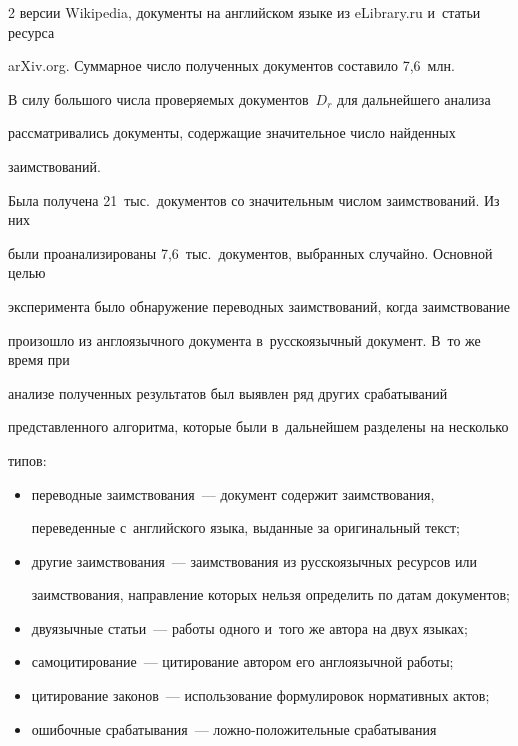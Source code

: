 \begin{multicols}{2}
версии Wikipedia, документы на английском языке из {\sf eLibrary.ru} и~\mbox{статьи} ресурса 


arXiv.org. Суммарное число полученных документов составило 7,6~млн.





В силу большого числа проверяемых документов~$D_r$ для дальнейшего анализа 


рассматривались документы, содержащие значительное число найден\-ных 


заимствований.


Была получена 21~тыс.\ документов со значительным числом заимствований. Из них 


были проанализированы 7,6~тыс.\ документов, выбранных случайно. Основной \mbox{целью} 


эксперимента было обнаружение переводных заимствований, когда заимствование 


произошло из англоязычного документа в~русскоязычный документ. В~то же время при 


анализе полученных результатов был выявлен ряд других срабатываний 


представленного алгоритма, которые были в~дальнейшем разделены на несколько 


типов:


\begin{itemize}


\item переводные заимствования~--- документ содержит заимствования, 


переведенные с~английского языка, выданные за оригинальный текст;


\item другие заимствования~--- заимствования из русскоязычных ресурсов или 


заимствования, направление которых нельзя определить по датам документов;


\item двуязычные статьи~--- работы одного и~того же автора на двух языках;


\item самоцитирование~--- цитирование автором его англоязычной работы;


\item цитирование законов~--- использование формулировок нормативных актов;


\item ошибочные срабатывания~--- лож\-но-по\-ло\-жи\-тель\-ные срабатывания 



\end{itemize}
\end{multicols}
